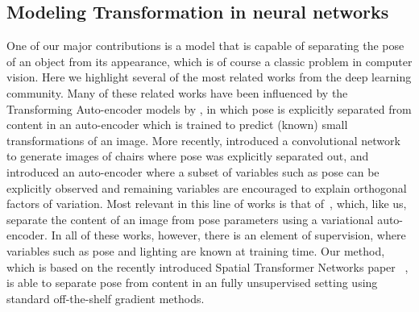 \subsection{Modeling Transformation in neural networks}\vspace{-2mm}
 One of our major contributions is a model that is capable of separating the pose of an object from its appearance,
which is of course a classic problem in computer vision.
Here we highlight several of the most related works from 
the deep learning community.  
Many of these  related works have been influenced by the Transforming Auto-encoder models by \cite{hinton2011transforming},
in which pose is explicitly separated from content in an auto-encoder which is trained to predict (known)
small transformations of an image.
More recently,  \cite{dosovitskiy2014learning} introduced a convolutional network to generate images of chairs where pose was explicitly separated out, and \cite{cheung2014discovering} introduced an auto-encoder where a subset of variables such as pose can be explicitly observed and remaining
variables are encouraged to explain orthogonal factors of variation.   
Most relevant in this line of works is that of~\cite{kulkarni2015deep}, which, like us, 
separate the content of an image from pose parameters using a variational auto-encoder.
In all of these works, however, there is an element of supervision, where variables such as pose
and lighting are known at training time. 
Our method,
which is based on the recently introduced Spatial
Transformer Networks paper
 ~\citep{jaderberg2015spatial},
is able to separate pose from content in an fully unsupervised setting 
using standard off-the-shelf gradient methods.



\vspace{-2mm}

